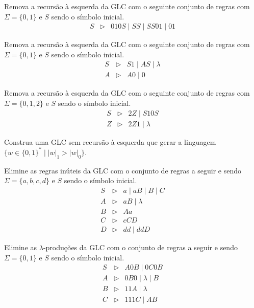 \begin{problemset}
    \item Remova a recursão à esquerda da GLC com o seguinte conjunto de regras com $\Sigma = \{0, 1\}$ e $S$ sendo o símbolo inicial.
    \begin{eqnarray*}
        S & \rhd & 010S \mid SS \mid SS01 \mid 01
    \end{eqnarray*}
    
    \item Remova a recursão à esquerda da GLC com o seguinte conjunto de regras com $\Sigma = \{0, 1\}$ e $S$ sendo o símbolo inicial.
    \begin{eqnarray*}
        S & \rhd & S1 \mid AS \mid \lambda\\
        A & \rhd & A0 \mid 0
    \end{eqnarray*}
    
    \item Remova a recursão à esquerda da GLC com o seguinte conjunto de regras com $\Sigma = \{0, 1, 2\}$ e $S$ sendo o símbolo inicial.
    \begin{eqnarray*}
        S & \rhd & 2Z \mid S10S\\
        Z & \rhd & 2Z1 \mid \lambda
    \end{eqnarray*}
    
    \item Construa uma GLC sem recursão à esquerda que gerar a linguagem $\{w \in \{0, 1\}^* \mid |w|_1 > |w|_0\}$.
    
    \item Elimine as regras inúteis da GLC com o conjunto de regras a seguir e sendo $\Sigma = \{a, b, c, d\}$ e $S$ sendo o símbolo inicial.
    \begin{eqnarray*}
        S & \rhd & a \mid aB \mid B \mid C\\
        A & \rhd & aB \mid \lambda\\
        B & \rhd & Aa \\
        C & \rhd & cCD\\
        D & \rhd & dd \mid ddD
    \end{eqnarray*}
    
    \item Elimine as $\lambda$-produções da GLC com o conjunto de regras a seguir e sendo $\Sigma = \{0, 1\}$ e $S$ sendo o símbolo inicial.
    \begin{eqnarray*}
        S & \rhd & A0B \mid 0C0B\\
        A & \rhd & 0B0 \mid \lambda \mid B\\
        B & \rhd & 11A \mid \lambda \\
        C & \rhd & 111C \mid AB
    \end{eqnarray*}
    

\end{problemset}
